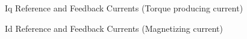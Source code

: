 \begin{frame}{Iq Reference and Feedback Currents (Torque producing current)}
	\begin{figure}
		\centering


	\end{figure}
\end{frame}

\begin{frame}{Id Reference and Feedback Currents (Magnetizing current)}
	\begin{figure}
		\centering


	\end{figure}
\end{frame}


